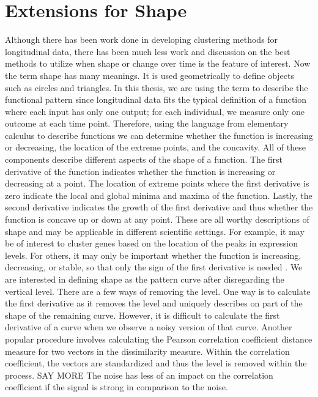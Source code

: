 \documentclass[12pt]{article}
\begin{document}
\section{Extensions for Shape}
Although there has been work done in developing clustering methods for longitudinal data, there has been much less work and discussion on the best methods to utilize when shape or change over time is the feature of interest. Now the term shape has many meanings. It is used geometrically to define objects such as circles and triangles. In this thesis, we are using the term to describe the functional pattern since longitudinal data fits the typical definition of a function where each input has only one output; for each individual, we measure only one outcome at each time point. Therefore, using the language from elementary calculus to describe functions we can determine whether the function is increasing or decreasing, the location of the extreme points, and the concavity. All of these components describe different aspects of the shape of a function. The first derivative of the function indicates whether the function is increasing or decreasing at a point. The location of extreme points where the first derivative is zero indicate the local and global minima and maxima of the function. Lastly, the second derivative indicates the growth of the first derivative and thus whether the function is concave up or down at any point. These are all worthy descriptions of shape and may be applicable in different scientific settings. For example, it may be of interest to cluster genes based on the location of the peaks in expression levels. For others, it may only be important whether the function is increasing, decreasing, or stable, so that only the sign of the first derivative is needed \cite{phang2003}. We are interested in defining shape as the pattern curve after disregarding the vertical level. There are a few ways of removing the level. One way is to calculate the first derivative as it removes the level and uniquely describes on part of the shape of the remaining curve. However, it is difficult to calculate the first derivative of a curve when we observe a noisy version of that curve. Another popular procedure involves calculating the Pearson correlation coefficient distance measure for two vectors in the dissimilarity measure. Within the correlation coefficient, the vectors are standardized and thus the level is removed within the process. SAY MORE The noise has less of an impact on the correlation coefficient if the signal is strong in comparison to the noise.
\end{document}
